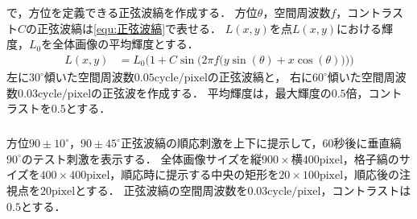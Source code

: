 \chapter{\kadaic}
\section{\method}
\paragraph{\kadaica}
\matlab で，方位を定義できる正弦波縞を作成する．
方位\(\theta\)，空間周波数\(f\)，コントラスト\(C\)の正弦波縞は\eqref{equ:正弦波縞}で表せる．
\(L(x,y)\)を点\(L(x,y)\)における輝度，\(L_0\)を全体画像の平均輝度とする．
\begin{align}
    L(x,y) & = L_0\Bigg(1+C\sin\Big(2\pi f\big(y\sin(\theta)+x\cos(\theta)\big)\Big)\Bigg)\label{equ:正弦波縞}
\end{align}
左に\(30^\circ\)傾いた空間周波数\(0.05\textrm{cycle}/\textrm{pixel}\)の正弦波縞と，
右に\(60^{\circ}\)傾いた空間周波数\(0.03\textrm{cycle}/\textrm{pixel}\)の正弦波を作成する．
平均輝度は，最大輝度の\(0.5\)倍，コントラストを\(0.5\)とする．
\paragraph{\kadaicb}
方位\(90\pm 10^\circ\)，\(90\pm 45^\circ\)正弦波縞の順応刺激を上下に提示して，\(60\)秒後に垂直縞\(90^\circ\)のテスト刺激を表示する．
全体画像サイズを\(\textrm{縦}900\times\textrm{横}400\textrm{pixel}\)，格子縞のサイズを\(400\times 400\textrm{pixel}\)，順応時に提示する中央の矩形を\(20\times 100\textrm{pixel}\)，順応後の注視点を\(20\textrm{pixel}\)とする．
正弦波縞の空間周波数を\(0.03\textrm{cycle}/\textrm{pixel}\)，コントラストは\(0.5\)とする．
